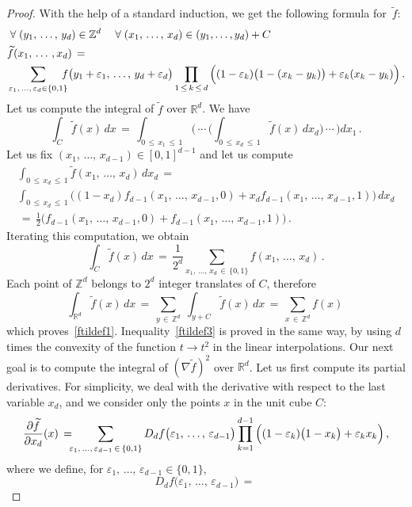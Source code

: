 \documentclass[10pt]{amsart}
\theoremstyle{definition}\newtheorem{defi}[theo]{Definition}\newtheorem{rema}[theo]{Remark}\newtheorem{exam}[theo]{Example}\newtheorem{exem}[theo]{Example}\newtheorem{nota}[theo]{Notation}
\newcommand*\Zd {{\mathbb Z^d}}
\newcommand*\Rd {{\mathbb R^d}}
\newcommand*\R{\mathbb{R}}
\newcommand*\ft{\widetilde f}
\let\oldforall\forall
\renewcommand*{\forall}{\mathrel{\oldforall}}
\begin{document}
\begin{proof}
With the help of a standard induction, we get the following formula for~$\ft$:
\begin{align*}
&\forall (y_1,\,\dots,\,y_{d})\in \Zd\quad
\forall (x_1,\,\dots,\,x_{d})\in (y_1,\dots,y_{d})+C
\\
&\ft(x_1,\,\dots\,,x_d)\,=\,\\
&\sum_{\varepsilon_1,\,\dots,\,\varepsilon_{d} \in\{0,1\}}
\kern-7pt f\big(y_1+\varepsilon_1,\,\dots,\,y_d+\varepsilon_d\big)
\prod_{1\,\leq\,k\,\leq\,d}\Big((1-\varepsilon_k)\big(1-(x_k-y_k)\big) +\varepsilon_k(x_k-y_k)\Big)
\,.
\end{align*}
Let us compute the integral of $\ft$ over $\R^d$. We have
\[
\int_{C}\ft(x)\,dx\,=\,
\int_{0\,\leq\,x_1\,\leq\,1}\Bigg(\,\cdots
\,\Bigg(\int_{0\,\leq\,x_d\,\leq\,1}
\ft(x)\,dx_d\Bigg)\,\cdots\,\Bigg) dx_1\,.
\]
Let us fix $(x_1,\,\dots,\,x_{d-1})\in [0,1]^{d-1}$ and let us compute
\begin{multline*}
\int_{0\,\leq\,x_d\,\leq\,1}
\ft (x_1,\,\dots,\,x_{d})
\,dx_d\,=\\
\int_{0\,\leq\,x_d\,\leq\,1}
\Big((1-x_d)f_{d-1} (x_1,\,\dots,\,x_{d-1},0) +x_df_{d-1} (x_1,\,\dots,\,x_{d-1},1)
\Big)
\,dx_d\\
\,=\,
\frac{1}{2}\Big(f_{d-1} (x_1,\,\dots,\,x_{d-1},0) +f_{d-1} (x_1,\,\dots,\,x_{d-1},1)
\Big)\,.
\end{multline*}
Iterating this computation, we obtain
\[
\int_{C}\ft(x)\,dx\,=\,
\frac{1}{2^d}\sum_{x_1,\,\dots,\,x_d\,\in\,\{0,1\}}
f (x_1,\,\dots,\,x_{d})\,.
\]
Each point of $\Zd$ belongs to $2^d$ integer translates of $C$, therefore
\[
\int_{\Rd}\ft(x)\,dx\,=\,\sum_{y\,\in\,\Zd}\;
\int_{y+C}\ft(x)\,dx\,=\,
\sum_{x\,\in\,\Zd}f(x)\,
\]
which proves~\eqref{ftildef1}. Inequality~\eqref{ftildef3} is proved in the same way, by using $d$ times the convexity of the function $t\to t^2$ in the linear interpolations. Our next goal is to compute the integral of $(\nabla\ft)^2$ over $\R^d$. Let us first compute its partial derivatives. For simplicity, we deal with the derivative with respect to the last variable $x_d$, and we consider only the points $x$ in the unit cube $C$:
\[
\frac{\partial\ft}{\partial x_d}(x)\,=\,
\kern-7pt
\sum_{\varepsilon_1,\,\dots,\,\varepsilon_{d-1}\,\in\,\{0,1\}}
 D_df\big(\varepsilon_1,\,\dots,\,\varepsilon_{d-1}\big)
\prod_{k=1}^{d-1}\Big((1-\varepsilon_k)\big(1-x_k\big) +\varepsilon_kx_k\Big)
\,,
\]
where we define, for ${\varepsilon_1,\,\dots,\,\varepsilon_{d-1} \in\{0,1\}}$,
\[
D_df\big(\varepsilon_1,\,\dots,\,\varepsilon_{d-1}\big)\,=\,
\]
\end{proof}
\end{document}
